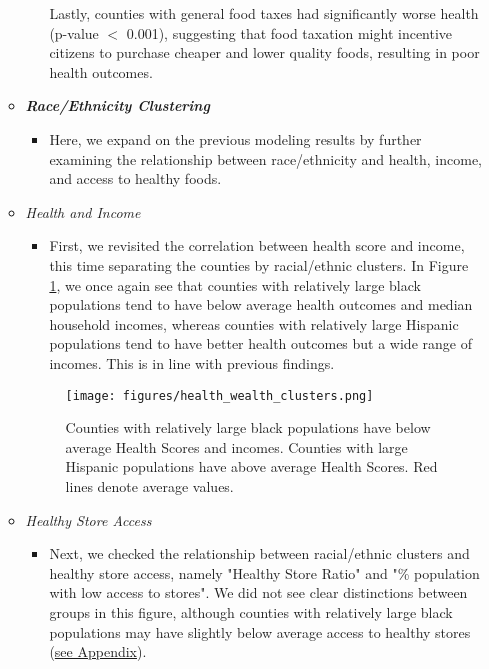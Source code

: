 \documentclass{article}
\begin{document}
\begin{itemize}[leftmargin=0pt]
\begin{itemize}
\begin{itemize}
    Lastly, counties with general food taxes had significantly worse health (p-value $<$ 0.001), suggesting that food taxation might incentive citizens to purchase cheaper and lower quality foods, resulting in poor health outcomes. 
\end{itemize}

\item[] \textbf{\textit{Race/Ethnicity Clustering}}
\begin{itemize}
    \item[] Here, we expand on the previous modeling results by further examining the relationship between race/ethnicity and health, income, and access to healthy foods. 
\end{itemize}

\item[] \textit{Health and Income}
\begin{itemize}
    \item[] First, we revisited the correlation between health score and income, this time separating the counties by racial/ethnic clusters. In Figure \ref{fig:health_wealth_clusters}, we once again see that counties with relatively large black populations tend to have below average health outcomes and median household incomes, whereas counties with relatively large Hispanic populations tend to have better health outcomes but a wide range of incomes. This is in line with previous findings.
\end{itemize}
\begin{figure}[h!]
    \centering
    \texttt{[image: figures/health\_wealth\_clusters.png]}
    \caption{Counties with relatively large black populations have below average Health Scores and incomes. Counties with large Hispanic populations have above average Health Scores. Red lines denote average values.}
    \label{fig:health_wealth_clusters}
\end{figure}

\item[] \textit{Healthy Store Access}
\begin{itemize}
    \item[] Next, we checked the relationship between racial/ethnic clusters and healthy store access, namely "Healthy Store Ratio" and "\% population with low access to stores". We did not see clear distinctions between groups in this figure, although counties with relatively large black populations may have slightly below average access to healthy stores (\hyperref[fig:cluster_store_access]{see Appendix}).
\end{itemize}


\end{itemize}
\end{itemize}
\end{document}
